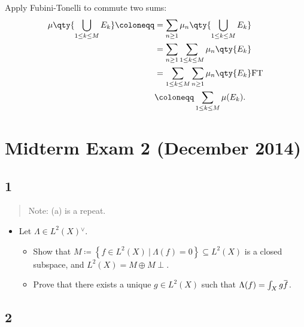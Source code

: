 \begin{solution}

Apply Fubini-Tonelli to commute two sums:
\begin{align*}
\mu\qty{\displaystyle\bigcup_{1\leq k \leq M} E_k}\coloneqq
&= \sum_{n\geq 1} \mu_n\qty{\displaystyle\bigcup_{1\leq k \leq M} E_k}\\
&= \sum_{n\geq 1} \sum_{1\leq k \leq M} \mu_n\qty{E_k}\\
&= \sum_{1\leq k \leq M}\sum_{n\geq 1} \mu_n\qty{E_k} \text{FT} \\
&\coloneqq\sum_{1\leq k \leq M} \mu(E_k)
.\end{align*}

\end{solution}

\hypertarget{midterm-exam-2-december-2014}{%
\section{Midterm Exam 2 (December
2014)}\label{midterm-exam-2-december-2014}}

\hypertarget{section}{%
\subsection{1}\label{section}}

\begin{quote}
Note: (a) is a repeat.
\end{quote}

\begin{itemize}
\tightlist
\item
  Let \(\Lambda\in L^2(X) {}^{ \vee }\).

  \begin{itemize}
  \tightlist
  \item
    Show that
    \(M\coloneqq\left\{{f\in L^2(X) {~\mathrel{\Big|}~}\Lambda(f) = 0}\right\} \subseteq L^2(X)\)
    is a closed subspace, and \(L^2(X) = M \oplus M\perp\).
  \item
    Prove that there exists a unique \(g\in L^2(X)\) such that
    \(\Lambda(f) = \int_X g \mkern 1.5mu\overline{\mkern-1.5muf\mkern-1.5mu}\mkern 1.5mu\).
  \end{itemize}
\end{itemize}

\hypertarget{section-1}{%
\subsection{2}\label{section-1}}

